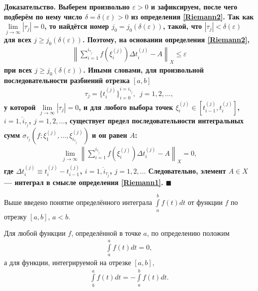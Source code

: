 \documentclass{report}
\newenvironment{Proof}{\par\noindent\bf Доказательство.\rm}{ $\blacksquare$\par}
\begin{document}
\begin{Proof}
Выберем произвольно $\varepsilon>0$ и зафиксируем, после чего подберём по нему число $\delta=\delta(\varepsilon)>0$ из определения \ref{Riemann2}. Так как
$\lim\limits_{j\to\infty}|\tau_j|=0$, то найдётся номер $j_0=j_0(\delta(\varepsilon))$, такой, что $|\tau_j|<\delta(\varepsilon)$ для всех $j\geqslant j_0(\delta(\varepsilon))$. Поэтому,
на основании определения \ref{Riemann2},
\begin{gather*}
\left\|\sum\limits_{i=1}^{i_{\tau_j}}f(\xi^{(j)}_i)\Delta t^{(j)}_i-A\right\|_X\leqslant\varepsilon
\end{gather*}
при всех $j\geqslant j_0(\delta(\varepsilon))$. Иными словами, для произвольной последовательности разбиений отрезка $[a,b]$
\begin{gather*}
\tau_j=\{t_i^{(j)}\}^{i=i_{\tau_j}}_{i=0},\,\,\,j=1,2,\dots,
\end{gather*}
у которой $\lim\limits_{j\to\infty}|\tau_j|=0$, и для любого выбора точек $\xi^{(j)}_i\in[t^{(j)}_{i-1},t^{(j)}_i]$, $i=\overline{1,i_{\tau_j}}$, $j=1,2,\dots$, существует предел
последовательности интегральных сумм $\sigma_{\tau_j}(f;\xi^{(j)}_1,\dots,\xi^{(j)}_{i_{\tau_j}})$ и он равен $A$:
\begin{gather*}
\lim\limits_{j\to\infty}\left\|\sum\limits_{i=1}^{i_{\tau_j}}f(\xi^{(j)}_i)\Delta t^{(j)}_i-A\right\|_X=0,
\end{gather*}
где $\Delta t^{(j)}_i\equiv t^{(j)}_i-t^{(j)}_{i-1}$, $i=\overline{1,i_{\tau_j}}$, $j=1,2,\dots$ Следовательно, элемент $A\in X$ --- интеграл в смысле определения \ref{Riemann1}.
\end{Proof}

Выше введено понятие определённого интеграла $\int\limits_a^bf(t)dt$ от функции $f$ по отрезку $[a,b]$, $a<b$.

Для любой функции $f$, определённой в точке $a$, по определению положим
\begin{gather*}
\int\limits_a^af(t)dt=0,
\end{gather*}
а для функции, интегрируемой на отрезке $[a,b]$,
\begin{gather*}
\int\limits_b^af(t)dt=-\int\limits_a^bf(t)dt.
\end{gather*}
\end{document}
